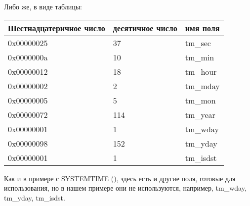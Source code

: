 Либо же, в виде таблицы:

\begin{center}
\begin{tabular}{ | l | l | l | }
\hline
\headercolor{} Шестнадцатеричное число & 
\headercolor{} десятичное число & 
\headercolor{} имя поля \\
\hline
0x00000025 & 37 	& tm\_sec \\
\hline
0x0000000a & 10 	& tm\_min \\
\hline
0x00000012 & 18 	& tm\_hour \\	
\hline
0x00000002 & 2 		& tm\_mday \\	
\hline
0x00000005 & 5 		& tm\_mon \\	
\hline
0x00000072 & 114 	& tm\_year \\
\hline
0x00000001 & 1 		& tm\_wday \\	
\hline
0x00000098 & 152 	& tm\_yday \\	
\hline
0x00000001 & 1 		& tm\_isdst \\
\hline
\end{tabular}
\end{center}

Как и в примере с SYSTEMTIME (), здесь есть и другие поля, готовые для использования, 
но в нашем примере они не используются, например, tm\_wday, tm\_yday, tm\_isdst.
